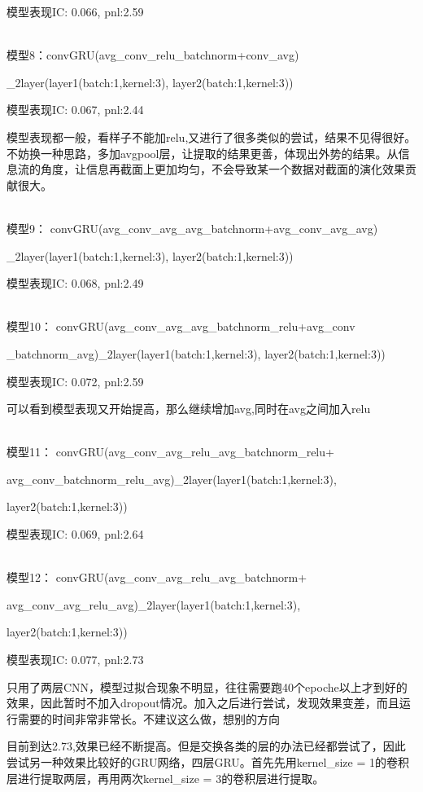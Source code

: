 \documentclass[11pt]{ctexart}
\begin{document}
模型表现{\kaishu \small IC: 0.066, pnl:2.59}

~\\
模型8：convGRU(avg\_conv\_relu\_batchnorm+conv\_avg)

\_2layer(layer1(batch:1,kernel:3), layer2(batch:1,kernel:3))

模型表现{\kaishu \small IC: 0.067, pnl:2.44}

模型表现都一般，看样子不能加relu,又进行了很多类似的尝试，结果不见得很好。不妨换一种思路，多加avgpool层，让提取的结果更善，体现出外势的结果。从信息流的角度，让信息再截面上更加均匀，不会导致某一个数据对截面的演化效果贡献很大。

~\\
模型9：
convGRU(avg\_conv\_avg\_avg\_batchnorm+avg\_conv\_avg\_avg)

\_2layer(layer1(batch:1,kernel:3), layer2(batch:1,kernel:3))

模型表现{\kaishu \small IC: 0.068, pnl:2.49}

~\\
模型10：
convGRU(avg\_conv\_avg\_avg\_batchnorm\_relu+avg\_conv

\_batchnorm\_avg)\_2layer(layer1(batch:1,kernel:3), layer2(batch:1,kernel:3))

模型表现{\kaishu \small IC: 0.072, pnl:2.59}

可以看到模型表现又开始提高，那么继续增加avg,同时在avg之间加入relu

~\\
模型11：
convGRU(avg\_conv\_avg\_relu\_avg\_batchnorm\_relu+

avg\_conv\_batchnorm\_relu\_avg)\_2layer(layer1(batch:1,kernel:3), 

layer2(batch:1,kernel:3))

模型表现{\kaishu \small IC: 0.069, pnl:2.64}

~\\
模型12：
convGRU(avg\_conv\_avg\_relu\_avg\_batchnorm+

avg\_conv\_avg\_relu\_avg)\_2layer(layer1(batch:1,kernel:3), 

layer2(batch:1,kernel:3))

模型表现{\kaishu \small IC: 0.077, pnl:2.73}

只用了两层CNN，模型过拟合现象不明显，往往需要跑40个epoche以上才到好的效果，因此暂时不加入dropout情况。加入之后进行尝试，发现效果变差，而且运行需要的时间非常非常长。不建议这么做，想别的方向

目前到达2.73,效果已经不断提高。但是交换各类的层的办法已经都尝试了，因此尝试另一种效果比较好的GRU网络，四层GRU。首先先用kernel\_size = 1的卷积层进行提取两层，再用两次kernel\_size = 3的卷积层进行提取。
\end{document}
